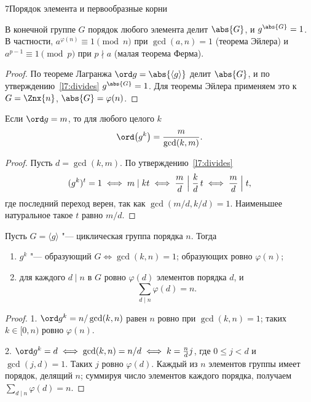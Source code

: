 \begin{lecture}{7}{Порядок элемента и первообразные корни}
\begin{corollary}\label{l7:ord-divides}
В конечной группе $G$ порядок любого элемента делит $\abs{G}$, и $g^{\abs{G}} = 1$. В
частности, $a^{\varphi(n)} \equiv 1 \pmod n$ при $\gcd(a, n) = 1$ (теорема Эйлера) и
$a^{p-1} \equiv 1 \pmod p$ при $p \nmid a$ (малая теорема Ферма).
\end{corollary}

\begin{proof}
По теореме Лагранжа $\ord g = \abs{\langle g \rangle}$ делит $\abs{G}$, и по
утверждению~\ref{l7:divides} $g^{\abs{G}} = 1$. Для теоремы Эйлера применяем это к
$G = \Znx{n}$, $\abs{G} = \varphi(n)$.
\end{proof}

\begin{theorem}\label{l7:ord-power}
Если $\ord g = m$, то для любого целого $k$
\[
  \ord\bigl(g^k\bigr) = \frac{m}{\gcd(k, m)}.
\]
\end{theorem}

\begin{proof}
Пусть $d = \gcd(k, m)$. По утверждению~\ref{l7:divides}
\[
  (g^k)^t = 1 \iff m \mid kt \iff \frac md \Bigm| \frac kd\, t \iff \frac md \Bigm| t,
\]
где последний переход верен, так как $\gcd(m/d, k/d) = 1$. Наименьшее натуральное такое $t$
равно $m/d$.
\end{proof}

\begin{corollary}\label{l7:cyclic-count}
Пусть $G = \langle g \rangle$ "--- циклическая группа порядка $n$. Тогда
\begin{enumerate}
  \item $g^k$ "--- образующий $G \iff \gcd(k, n) = 1$; образующих ровно $\varphi(n)$;
  \item для каждого $d \mid n$ в $G$ ровно $\varphi(d)$ элементов порядка $d$, и
    \[
      \sum_{d \mid n} \varphi(d) = n.
    \]
\end{enumerate}
\end{corollary}

\begin{proof}
1. $\ord g^k = n/\gcd(k, n)$ равен $n$ ровно при $\gcd(k, n) = 1$; таких $k \in [0, n)$
ровно $\varphi(n)$.

2. $\ord g^k = d \iff \gcd(k, n) = n/d \iff k = \frac nd j$, где $0 \le j < d$ и
$\gcd(j, d) = 1$. Таких $j$ ровно $\varphi(d)$. Каждый из $n$ элементов группы имеет порядок,
делящий $n$; суммируя число элементов каждого порядка, получаем $\sum_{d \mid n} \varphi(d) = n$.
\end{proof}


\end{lecture}
